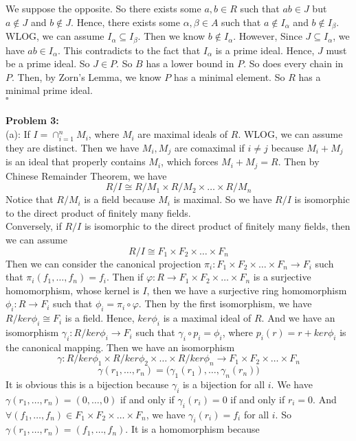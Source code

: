 \documentclass[12pt]{amsart}
\begin{document}
We suppose the opposite. So there exists some $a,b\in R$ such that $ab\in J$ but $a\notin J$ and $b\notin J$. Hence, there exists some $\alpha,\beta\in A$ such that $a\notin I_\alpha$ and $b\notin I_\beta$. WLOG, we can assume $I_\alpha\subseteq I_\beta$. Then we know $b\notin I_\alpha$. However, Since $J\subseteq I_\alpha$, we have $ab\in I_\alpha$. This contradicts to the fact that $I_\alpha$ is a prime ideal. Hence, $J$ must be a prime ideal. So $J\in P$. So $B$ has a lower bound in $P$. So does every chain in $P$. Then, by Zorn's Lemma, we know $P$ has a minimal element. So $R$ has a minimal prime ideal.
\\\phantom{qed}\hfill$\square$\\
\pagebreak\\
\textbf{Problem 3:}\\
(a): If $I=\cap_{i=1}^n M_i$, where $M_i$ are maximal ideals of $R$. WLOG, we can assume they are distinct. Then we have $M_i,M_j$ are comaximal if $i\neq j$ because $M_i+M_j$ is an ideal that properly contains $M_i$, which forces $M_i+M_j=R$. Then by Chinese Remainder Theorem, we have 
\[R/I\cong R/M_1\times R/M_2\times \dots\times R/M_n\]
Notice that $R/M_i$ is a field because $M_i$ is maximal. So we have $R/I$ is isomorphic to the direct product of finitely many fields.\\
Conversely, if $R/I$ is isomorphic to the direct product of finitely many fields, then we can assume 
\[R/I\cong F_1\times F_2\times \dots \times F_n\]
Then we can consider the canonical projection $\pi_i: F_1\times F_2\times \dots \times F_n\to F_i$ such that $\pi_i(f_1,\dots,f_n)=f_i$. Then if $\varphi:R\to F_1\times F_2\times \dots \times F_n$ is a surjective homomorphism, whose kernel is $I$, then we have a surjective ring homomorphism $\phi_i:R\to F_i$ such that $\phi_i=\pi_i\circ \varphi$. Then by the first isomorphism, we have $R/ker\phi_i\cong F_i$ is a field. Hence, $ker\phi_i$ is a maximal ideal of $R$. And we have an isomorphism $\gamma_i:R/ker\phi_i\to F_i$ such that $\gamma_i\circ p_i=\phi_i$, where $p_i(r)=r+ker\phi_i$ is the canonical mapping. Then we have an isomorphism 
\[\gamma:R/ker\phi_1\times R/ker\phi_2\times \dots\times R/ker\phi_n \to F_1\times F_2\times \dots \times F_n\]
\[\gamma(r_1,\dots,r_n)=\big(\gamma_1(r_1),\dots,\gamma_n(r_n)\big)\]
It is obvious this is a bijection because $\gamma_i$ is a bijection for all $i$. We have $\gamma(r_1,\dots,r_n)=(0,\dots,0)$ if and only if $\gamma_i(r_i)=0 $ if and only if $r_i=0$. And $\forall (f_1,\dots,f_n)\in F_1\times F_2\times \dots \times F_n$, we have $\gamma_i(r_i)=f_i$ for all $i$. So $\gamma(r_1,\dots,r_n)=(f_1,\dots,f_n)$. It is a homomorphism because
\end{document}
